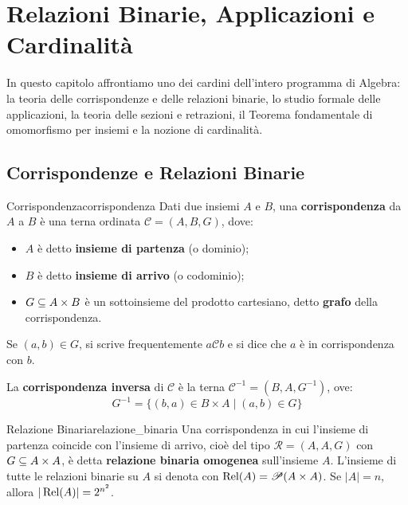 \chapter{Relazioni Binarie, Applicazioni e Cardinalità}
\label{chap:relazioni_applicazioni}

In questo capitolo affrontiamo uno dei cardini dell'intero programma di Algebra: la teoria delle corrispondenze e delle relazioni binarie, lo studio formale delle applicazioni, la teoria delle sezioni e retrazioni, il Teorema fondamentale di omomorfismo per insiemi e la nozione di cardinalità.

\section{Corrispondenze e Relazioni Binarie}

\begin{definizione}{Corrispondenza}{corrispondenza}
Dati due insiemi $A$ e $B$, una \textbf{corrispondenza} da $A$ a $B$ è una terna ordinata $\mathcal{C} = (A, B, G)$, dove:
\begin{itemize}
    \item $A$ è detto \textbf{insieme di partenza} (o dominio);
    \item $B$ è detto \textbf{insieme di arrivo} (o codominio);
    \item $G \subseteq A \times B$ è un sottoinsieme del prodotto cartesiano, detto \textbf{grafo} della corrispondenza.
\end{itemize}
Se $(a, b) \in G$, si scrive frequentemente $a \mathcal{C} b$ e si dice che $a$ è in corrispondenza con $b$.

La \textbf{corrispondenza inversa} di $\mathcal{C}$ è la terna $\mathcal{C}^{-1} = (B, A, G^{-1})$, ove:
\[
    G^{-1} = \{(b, a) \in B \times A \mid (a, b) \in G\}
\]
\end{definizione}

\begin{definizione}{Relazione Binaria}{relazione_binaria}
Una corrispondenza in cui l'insieme di partenza coincide con l'insieme di arrivo, cioè del tipo $\mathcal{R} = (A, A, G)$ con $G \subseteq A \times A$, è detta \textbf{relazione binaria omogenea} sull'insieme $A$.
L'insieme di tutte le relazioni binarie su $A$ si denota con $\operatorname{Rel}(A) = \mathscr{P}(A \times A)$. Se $|A| = n$, allora $|\operatorname{Rel}(A)| = 2^{n^2}$.
\end{definizione}

